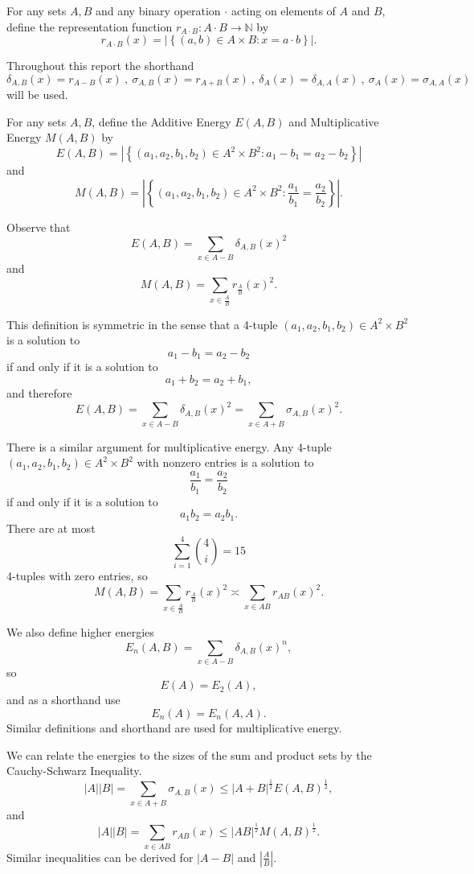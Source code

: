 \documentclass[12pt,reqno]{amsart}
\begin{document}
For any sets \(A,B\) and any binary operation \(\cdot \) acting on elements of \(A\) and \(B\), define the representation function
\(r_{A \cdot B} : A \cdot B \to \mathbb{N} \) by
\[
    r_{A \cdot B} (x) = \left\lvert \left\{ (a,b)\in  A \times B : x = a \cdot b \right\}  \right\rvert
.\]

Throughout this report the shorthand
\[
    \delta_{A,B} (x) = r_{A - B} (x)~,~ \sigma _{A,B} (x) = r_{A + B} (x)~,~ \delta_{A} (x) = \delta_{A,A} (x) ~,~ \sigma_{A} (x) = \sigma _{A,A} (x)
\]
will be used.

For any sets \(A,B\), define the Additive Energy \(E(A,B)\) and Multiplicative Energy \(M(A,B)\) by
\[
    E(A,B) = \left\lvert \left\{ (a_1,a_2,b_1,b_2) \in A^{2} \times B^{2} : a_1 - b_1 = a_2 - b_2 \right\}  \right\rvert 
\]
and
\[
    M(A,B) = \left\lvert \left\{ (a_1,a_2,b_1,b_2)\in  A^{2} \times B^{2} : \frac{a_1}{b_1}  = \frac{a_2}{b_2}  \right\}  \right\rvert
.\]

Observe that
\[
    E(A,B) = \sum _{x \in A - B} \delta_{A,B} (x)^{2}
\]
and
\[
    M(A,B) = \sum _{x \in \frac{A}{B} } r_{\frac{A}{B} } (x)^{2} 
.\]

This definition is symmetric in the sense that a 4-tuple \((a_1,a_2,b_1,b_2)\in A^{2} \times B^{2}\) is a solution to
\[
    a_1 - b_1 = a_2 - b_2
\]
if and only if it is a solution to
\[
    a_1+b_2 = a_2+b_1
,\]
and therefore
\[
    E(A,B) =\sum _{x \in A - B} \delta_{A,B}  (x)^{2} = \sum _{x \in A + B} \sigma_{A,B}  (x)^{2}
.\]

There is a similar argument for multiplicative energy.
Any 4-tuple \((a_1,a_2,b_1,b_2) \in A^{2} \times B^{2}\) with nonzero entries is a solution to
\[
    \frac{a_1}{b_1} = \frac{a_2}{b_2}
\]
if and only if it is a solution to
\[
    a_1 b_2 = a_2 b_1
.\]
There are at most
\[
    \sum _{i = 1} ^{4} \binom{4}{i}  = 15
\]
4-tuples with zero entries, so
\[
    M(A,B) = \sum _{x \in \frac{A}{B} } r_{\frac{A}{B} } (x) ^{2} \asymp \sum _{x \in AB} r_{AB} (x)^{2}
.\]

We also define higher energies
\[
    E_{n} (A,B) = \sum _{x \in A-B} \delta_{A,B} (x)^{n}  
,\]
so
\[
    E(A) = E_{2} (A)
,\]
and as a shorthand use
\[
    E_{n} (A) = E_{n} (A,A)
.\]
Similar definitions and shorthand are used for multiplicative energy.

We can relate the energies to the sizes of the sum and product sets by the Cauchy-Schwarz Inequality.
\[
    \left\lvert A \right\rvert \left\lvert B \right\rvert = \sum _{x \in A + B} \sigma_{A,B}  (x) \leq \left\lvert A + B \right\rvert ^{\frac{1}{2} } E(A,B)^{\frac{1}{2} }
,\]
and
\[
    \left\lvert A \right\rvert \left\lvert B \right\rvert = \sum _{x \in AB} r_{AB} (x) \leq \left\lvert AB \right\rvert ^{\frac{1}{2} }M(A,B)^{\frac{1}{2} }
.\]
Similar inequalities can be derived for \(\left\lvert A-B \right\rvert \) and \(\left\lvert \frac{A}{B}  \right\rvert \).
\end{document}
